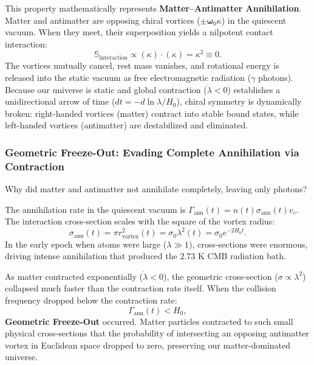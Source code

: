 This property mathematically represents \textbf{Matter--Antimatter Annihilation}. Matter and antimatter are opposing chiral vortices ($\pm \boldsymbol{\omega}_0 \kappa$) in the quiescent vacuum. When they meet, their superposition yields a nilpotent contact interaction:
\begin{equation}
    \mathbb{S}_{\mathrm{interaction}} \propto (\kappa) \cdot (\kappa) = \kappa^2 \equiv 0.
\end{equation}
The vortices mutually cancel, rest mass vanishes, and rotational energy is released into the static vacuum as free electromagnetic radiation ($\gamma$ photons). Because our universe is static and global contraction ($\dot{\lambda} < 0$) establishes a unidirectional arrow of time ($dt = -d\ln\lambda/H_0$), chiral symmetry is dynamically broken: right-handed vortices (matter) contract into stable bound states, while left-handed vortices (antimatter) are destabilized and eliminated.

\subsubsection{Geometric Freeze-Out: Evading Complete Annihilation via Contraction}
\label{sec:geometrik_donma_main}
Why did matter and antimatter not annihilate completely, leaving only photons?

The annihilation rate in the quiescent vacuum is $\Gamma_{\mathrm{ann}}(t) = n(t) \sigma_{\mathrm{ann}}(t) v_c$. The interaction cross-section scales with the square of the vortex radius:
\begin{equation}
    \sigma_{\mathrm{ann}}(t) = \pi r_{\mathrm{vortex}}^2(t) = \sigma_0 \lambda^2(t) = \sigma_0 e^{-2 H_0 t}.
    \label{eq:tesir_kesiti_main}
\end{equation}
In the early epoch when atoms were large ($\lambda \gg 1$), cross-sections were enormous, driving intense annihilation that produced the $2.73\text{ K}$ CMB radiation bath.

As matter contracted exponentially ($\dot{\lambda} < 0$), the geometric cross-section ($\sigma \propto \lambda^2$) collapsed much faster than the contraction rate itself. When the collision frequency dropped below the contraction rate:
\begin{equation}
    \Gamma_{\mathrm{ann}}(t) < H_0,
    \label{eq:donma_kriteri_main}
\end{equation}
\textbf{Geometric Freeze-Out} occurred. Matter particles contracted to such small physical cross-sections that the probability of intersecting an opposing antimatter vortex in Euclidean space dropped to zero, preserving our matter-dominated universe.

